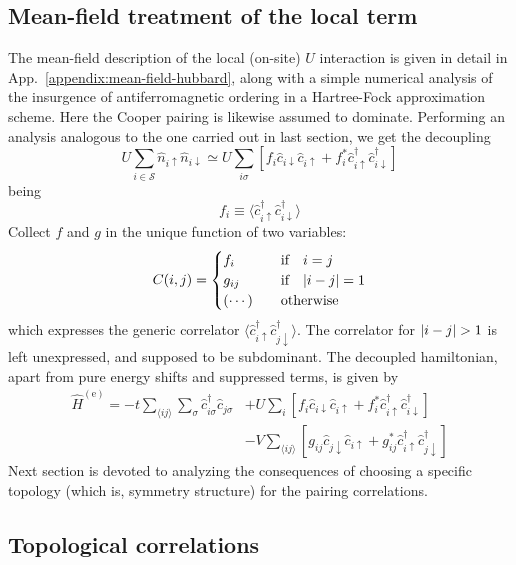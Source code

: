 \subsection{Mean-field treatment of the local term}

The mean-field description of the local (on-site) $U$ interaction is given in detail in App.~\ref{appendix:mean-field-hubbard}, along with a simple numerical analysis of the insurgence of antiferromagnetic ordering in a Hartree-Fock approximation scheme. Here the Cooper pairing is likewise assumed to dominate. Performing an analysis analogous to the one carried out in last section, we get the decoupling
\[
	U \sum_{i \in \mathcal{S}} \hat n_{i\uparrow} \hat n_{i\downarrow} \simeq U \sum_{i\sigma} \left[
		f_i \hat c_{i\downarrow} \hat c_{i\uparrow} + f_i^* \hat c_{i\uparrow}^\dagger \hat c_{i\downarrow}^\dagger
	\right]
\]
being
\[
	f_i \equiv \langle \hat c_{i\uparrow}^\dagger \hat c_{i\downarrow}^\dagger \rangle
\]
Collect $f$ and $g$ in the unique function of two variables:
\[
	C(i,j) = \begin{cases}
		f_i &\qq{if} i=j \\
		g_{ij} &\qq{if} \abs{i-j}=1 \\
		(\cdots) &\qq{otherwise}
	\end{cases}
\]
which expresses the generic correlator $\langle \hat c_{i\uparrow}^\dagger \hat c_{j\downarrow}^\dagger \rangle$. The correlator for $\abs{i-j}>1$ is left unexpressed, and supposed to be subdominant. The decoupled hamiltonian, apart from pure energy shifts and suppressed terms, is given by
\begin{align}
	\hat H^{(\mathrm{e})} =
	-t \sum_{\langle ij \rangle} \sum_\sigma \hat c_{i\sigma}^\dagger \hat c_{j\sigma}
	&+ U \sum_i \left[
	f_i \hat c_{i\downarrow} \hat c_{i\uparrow} + f_i^* \hat c_{i\uparrow}^\dagger \hat c_{i\downarrow}^\dagger
	\right] \nonumber \\
	&- V \sum_{\langle ij \rangle} \left[
	g_{ij} \hat c_{j\downarrow} \hat c_{i\uparrow} + g_{ij}^* \hat c_{i\uparrow}^\dagger \hat c_{j\downarrow}^\dagger
	\right] \label{eq:extended-hubbard-model-effective}
\end{align}
Next section is devoted to analyzing the consequences of choosing a specific topology (which is, symmetry structure) for the pairing correlations.

\subsection{Topological correlations}

